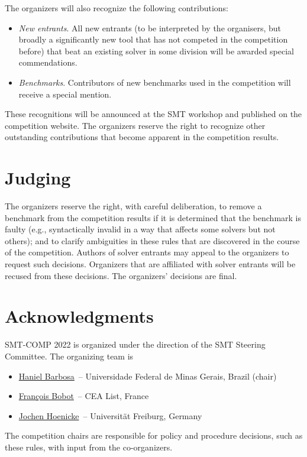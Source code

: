 \documentclass[12pt]{article}
\begin{document}
The organizers will also recognize the following contributions:
%
\begin{itemize}
\item \emph{New entrants}. All new entrants (to be interpreted by the organisers, but broadly a significantly new tool that has not competed in the competition before) that beat an existing solver in some division will be awarded special commendations.
\item \emph{Benchmarks}. Contributors of new benchmarks used in the competition will receive a special mention.
\end{itemize}
%
These recognitions will be announced at the SMT workshop and published on the competition website.
The organizers reserve the right to recognize other outstanding
contributions that become apparent in the competition results.



\section{Judging}

The organizers reserve the right, with careful deliberation, to remove
a benchmark from the competition results if it is determined that the
benchmark is faulty (e.g., syntactically invalid in a way that affects
some solvers but not others); and to clarify ambiguities in these
rules that are discovered in the course of the competition.  Authors
of solver entrants may appeal to the organizers to request such
decisions.  Organizers that are affiliated with solver entrants will
be recused from these decisions.  The organizers' decisions are final.


\section{Acknowledgments}

SMT-COMP 2022 is organized under the direction of the SMT Steering
Committee. The organizing team is
%
\begin{itemize}
\setlength{\itemsep}{0pt}
\item \href{http://homepages.dcc.ufmg.br/~hbarbosa/}{Haniel Barbosa}~--
Universidade Federal de Minas Gerais, Brazil (chair)
\item \href{https://github.com/bobot}{Fran\c{c}ois Bobot}~-- CEA List, France
\item \href{https://jochen-hoenicke.de/}{Jochen Hoenicke}~-- Universit\"at Freiburg, Germany
\end{itemize}
%
The competition chairs are responsible for policy and procedure decisions,
such as these rules, with input from the co-organizers.
\end{document}
